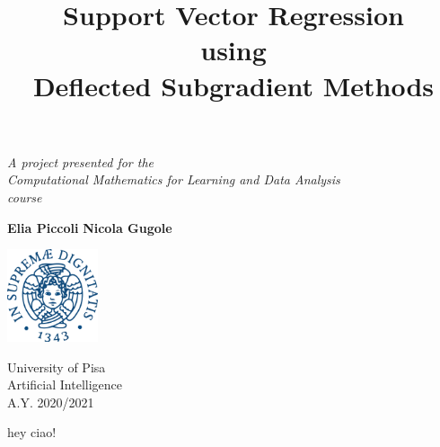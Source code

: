 \documentclass[12pt]{article}
\begin{document}
	\begin{titlepage}
			\title{Support Vector Regression\\using\\Deflected Subgradient Methods}
			\maketitle
	   \begin{center}
	       \vspace{0.5cm}
	        \textit{A project presented for the\\Computational Mathematics for Learning and Data Analysis\\course}
	            
	       \vspace{1.5cm}
	
	       \textbf{Elia Piccoli}\hspace{3.0cm}
			\textbf{Nicola Gugole}

	       \vfill
	            
	     
	       \includegraphics[width=0.2\textwidth]{unipi.png}
	            
			\hfill\newline
	       University of Pisa\\
	       Artificial Intelligence\\
			A.Y. 2020/2021\\
	            
	   \end{center}
	\end{titlepage}
	
	\newpage
	hey ciao!
\end{document}
